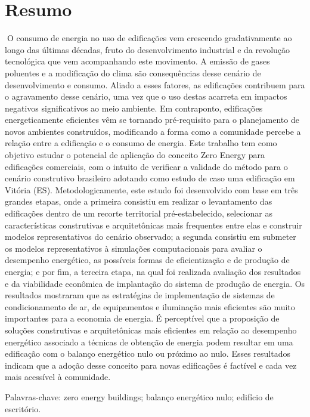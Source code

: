 \section{Resumo}
    \vspace*{1.5cm} %
    \thispagestyle{empty}
    \begin{onehalfspace}
  \noindent O consumo de energia no uso de edificações vem crescendo gradativamente ao longo das últimas décadas, fruto do desenvolvimento industrial e da revolução tecnológica que vem acompanhando este movimento. A emissão de gases poluentes e a modificação do clima são consequências desse cenário de desenvolvimento e consumo. Aliado a esses fatores, as edificações contribuem para o agravamento desse cenário, uma vez que o uso destas acarreta em impactos negativos significativos ao meio ambiente. Em contraponto, edificações energeticamente eficientes vêm se tornando pré-requisito para o planejamento de novos  ambientes construídos, modificando a forma como a comunidade percebe a relação entre a edificação e  o consumo de energia. Este trabalho tem como objetivo estudar o potencial de aplicação do conceito Zero Energy  para edificações comerciais, com o intuito de verificar a validade do método para o cenário construtivo brasileiro adotando como estudo de caso uma edificação em Vitória (ES). Metodologicamente, este estudo foi desenvolvido com base em três grandes etapas, onde a primeira consistiu em realizar o levantamento das edificações dentro de um recorte territorial pré-estabelecido, selecionar as características construtivas e arquitetônicas mais frequentes entre elas e construir modelos representativos do cenário observado; a segunda consistiu em  submeter os modelos representativos à simulações computacionais para avaliar o desempenho energético, as possíveis formas de eficientização e de produção de energia; e por fim, a terceira etapa, na qual foi realizada avaliação dos resultados e da viabilidade econômica de implantação do sistema de produção de energia. Os resultados mostraram que as estratégias de implementação de sistemas de condicionamento de ar, de equipamentos e iluminação mais eficientes são muito importantes para a economia de energia. É perceptível que a proposição de soluções construtivas e arquitetônicas mais eficientes em relação ao desempenho energético associado a técnicas de obtenção de energia podem resultar em uma edificação com o balanço energético nulo ou próximo ao nulo. Esses resultados indicam que a adoção desse conceito para novas edificações é factível e cada vez mais acessível à comunidade.
    
    \noindent Palavras-chave: zero energy buildings; balanço energético nulo; edifício de escritório.\pagebreak
    \end{onehalfspace}
